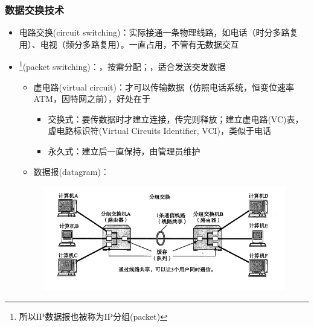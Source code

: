 \subsubsection{数据交换技术}
\begin{itemize}
\item 电路交换(circuit switching)：实际接通一条物理线路，如电话（时分多路复用）、电视（频分多路复用）。一直占用，不管有无数据交互
\item {}\footnote{所以IP数据报也被称为IP分组(packet)}(packet switching)：，按需分配；，适合发送突发数据
\begin{itemize}
	\item 虚电路(virtual circuit)：才可以传输数据（仿照电话系统，恒变位速率ATM，因特网之前），好处在于
	\begin{itemize}
	    \item 交换式：要传数据时才建立连接，传完则释放；建立虚电路(VC)表，虚电路标识符(Virtual Circuits Identifier, VCI)，类似于电话
	    \item 永久式：建立后一直保持，由管理员维护
	\end{itemize}
	\item 数据报(datagram)：
\end{itemize}
\begin{figure}[H]
	\centering
	\includegraphics[width=0.6\linewidth]{fig/ip-packet.png}
\end{figure}
\end{itemize}

